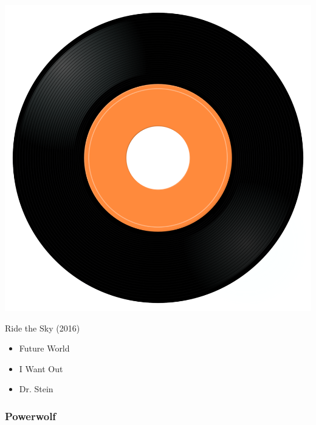 \begin{minipage}[t]{0.25\textwidth}
\captionsetup{type=figure}
\includegraphics[width=\textwidth]{Images/cover.png}
\caption*{Ride the Sky (2016)}
\end{minipage}
\begin{minipage}[t]{0.25\textwidth}\vspace{0pt}
\begin{itemize}[nosep,leftmargin=1em,labelwidth=*,align=left]
	\setlength{\itemsep}{0pt}
	\item Future World 
	\item I Want Out
	\item Dr. Stein
\end{itemize}
\end{minipage}

\subsubsection{Powerwolf}

